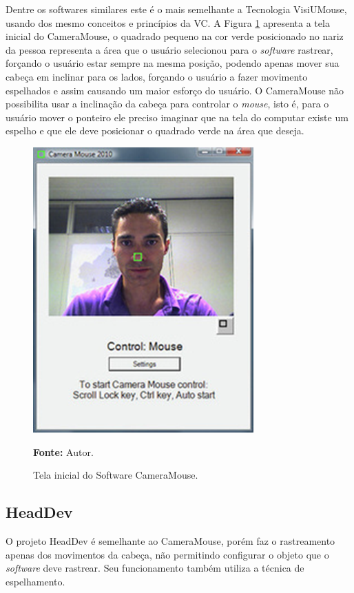 Dentre os softwares similares este é o mais semelhante a Tecnologia VisiUMouse, usando dos mesmo conceitos e princípios da VC. A Figura \ref{fig:camera-mouse} apresenta a tela inicial do CameraMouse, o quadrado pequeno na cor verde posicionado no nariz da pessoa representa a área que o usuário selecionou para o \textit{software} rastrear, forçando o usuário estar sempre na mesma posição, podendo apenas mover sua cabeça em inclinar para os lados, forçando o usuário a fazer movimento espelhados  e assim causando um maior esforço do usuário. O CameraMouse não possibilita usar a inclinação da cabeça para controlar o \textit{mouse}, isto é, para o usuário mover o ponteiro ele preciso imaginar que na tela do computar existe um espelho e que ele deve posicionar o quadrado verde na área que deseja.

\begin{figure}[htbp]
\caption{Tela inicial do Software CameraMouse.} 
\centering \includegraphics[scale=1]{img/camera-mouse.png}

\textbf{Fonte:} Autor.
\label{fig:camera-mouse}
\end{figure}

\subsection{HeadDev}
O projeto HeadDev  é semelhante ao CameraMouse, porém faz o rastreamento apenas dos movimentos da cabeça, não permitindo configurar o objeto que o \textit{software} deve rastrear. Seu funcionamento também utiliza a técnica de espelhamento.


